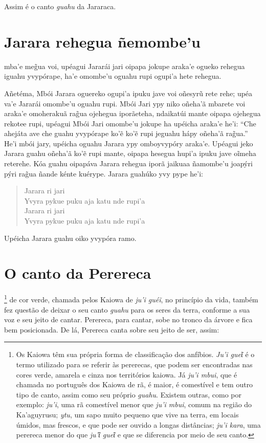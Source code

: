 Assim é o canto \textit{guahu} da Jararaca.


\chapter{Jarara rehegua ñemombe'u}

 mba'e meg̃ua voi, upéagui Jararái jari oipapa jokupe araka'e ogueko
rehegua iguahu yvypórape, ha'e omombe'u oguahu rupi ogupi'a hete
rehegua.


Añetéma, Mbói Jarara oguereko ogupi'a ipuku jave voi oñesyrũ rete rehe;
upéa va'e Jararái omombe'u oguahu rupi. Mbói Jari ypy niko oñeha'ã
mbarete voi araka'e omoherakuã rag̃ua ojehegua iporãeteha, ndaikatúi
mante oipapa ojehegua rekotee rupi, upéagui Mbói Jari omombe'u jokupe ha
upéicha araka'e he'i: ``Che ahejáta ave che guahu yvypórape ko'ẽ ko'ẽ
rupi jeguahu hápy oñeha'ã rag̃ua.'' He'i mbói jary, upéicha oguahu Jarara
ypy omboyvypóry araka'e. Upéagui jeko Jarara guahu oñeha'ã ko'ẽ rupi
mante, oipapa hesegua hupi'a ipuku jave oĩmeha reterehe. Kóa guahu
oipapáva Jarara rehegua iporã jaikuaa ñamombe'u joapýri pýri rag̃ua ñande
kénte kuérype. Jarara guahúko yvy pype he'i:

\begin{verse}
Jarara ri jari\\
Yvyra pykue puku aja katu nde rupi'a\\
Jarara ri jari\\
Yvyra pykue puku aja katu nde rupi'a
\end{verse}


Upéicha Jarara guahu oiko yvypóra ramo.


\chapter{O canto da Perereca}

\footnote{Os Kaiowa têm sua própria forma de classificação dos
  anfíbios. \textit{Ju'i gueῖ} é o termo utilizado para se referir às
  pererecas, que podem ser encontradas nas cores verde, amarela e cinza
  nos territórios kaiowa. Já \textit{ju'i mbui}, que é chamada no
  português dos Kaiowa de rã, é maior, é comestível e tem outro tipo de
  canto, assim como seu próprio \textit{guahu}. Existem outras, como por
  exemplo: \textit{ju'i}, uma rã comestível menor que \textit{ju'i mbui},
  comum na região do Ka'aguyrusu; \textit{ytu}, um sapo muito pequeno que
  vive na terra, em locais úmidos, mas frescos, e que pode ser ouvido a
  longas distâncias; \textit{ju'i kara}, uma perereca menor do que
  \textit{ju'ῖ gueῖ} e que se diferencia por meio de seu canto.} de cor
verde, chamada pelos Kaiowa de \textit{ju'i guéĩ}, no princípio da vida,
também fez questão de deixar o seu canto \textit{guahu} para os seres da
terra, conforme a sua voz e seu jeito de cantar. Perereca, para cantar,
sobe no tronco da árvore e fica bem posicionada. De lá, Perereca canta
sobre seu jeito de ser, assim:

